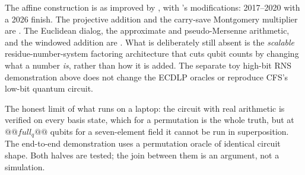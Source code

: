 \begin{keybox}[title={Where this part sits}]
The affine construction is \cite{ec:rnsl17} as improved by \cite{ec:hjnrs20}, with
\cite{ec:kim26}'s modifications: 2017--2020 with a 2026 finish. The projective addition and the
carry-save Montgomery multiplier are \cite{ec:kim26}. The Euclidean dialog, the approximate and
pseudo-Mersenne arithmetic, and the windowed addition are \cite{ec:schrott26}. What is deliberately
still absent is the \emph{scalable} residue-number-system factoring architecture
that cuts qubit counts by changing what a number \emph{is}, rather than how it is
added. The separate toy high-bit RNS demonstration above does not change the
ECDLP oracles or reproduce CFS's low-bit quantum circuit.

The honest limit of what runs on a laptop: the circuit with real arithmetic is verified on every
basis state, which for a permutation is the whole truth, but at $@@full_q@@$ qubits for a
seven-element field it cannot be run in superposition. The end-to-end demonstration uses a
permutation oracle of identical circuit shape. Both halves are tested; the join between them is an
argument, not a simulation.
\end{keybox}
